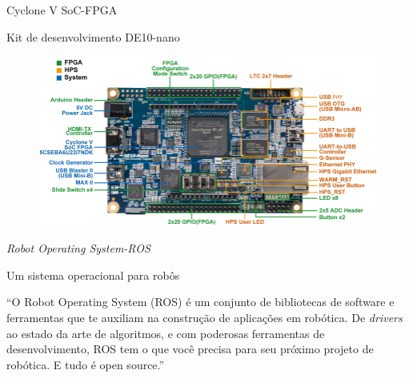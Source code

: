 \documentclass[10pt]{beamer}
\begin{document}
\begin{frame}{Cyclone V SoC-FPGA}
	\begin{alertblock}{Kit de desenvolvimento DE10-nano}
		\begin{figure}[h]
			\begin{center}
				\includegraphics[scale=1.45]{imagens/de10nano.png}\\
			\end{center}
			\label{fig:de10-nano}
		\end{figure}
	\end{alertblock}
\end{frame}

\begin{frame}{\textit{Robot Operating System-ROS}}
	\begin{alertblock}{Um sistema operacional para robôs}
		\vspace{0.1cm}
		\begin{justify}
			``O Robot Operating System (ROS) é um conjunto de bibliotecas de software e ferramentas que te auxiliam na construção de aplicações em robótica. De \textit{drivers} ao estado da arte de algoritmos, e com poderosas ferramentas de desenvolvimento, ROS tem o que você precisa para seu próximo projeto de robótica. E tudo é open source.'' 
		\end{justify}
		

	\end{alertblock}
\end{frame}
\end{document}

